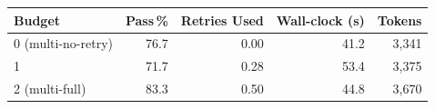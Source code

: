 \begin{tabular}{@{}lrrrr@{}}
\toprule
Budget & Pass\,\% & Retries Used & Wall-clock (s) & Tokens \\
\midrule
0 (multi-no-retry) & 76.7 & 0.00 & 41.2 & 3,341 \\
1 & 71.7 & 0.28 & 53.4 & 3,375 \\
2 (multi-full) & 83.3 & 0.50 & 44.8 & 3,670 \\
\bottomrule
\end{tabular}
